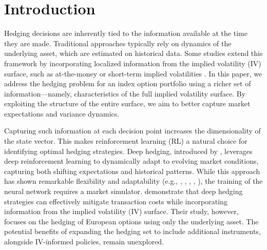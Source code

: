 \documentclass[12pt]{article}
\def\doublespacing{\setstretch{2}}
\begin{document}
\doublespacing%

\section{Introduction}\label{se:intro}

Hedging decisions are inherently tied to the information available at the time they are made. Traditional approaches typically rely on dynamics of the underlying asset, which are estimated on historical data. Some studies extend this framework by incorporating localized information from the implied volatility (IV) surface, such as at-the-money or short-term implied volatilities \citep{BATES2005195, ALEXANDER2007, franccois2021smile}. In this paper, we address the hedging problem for an index option portfolio using a richer set of information—namely, characteristics of the full implied volatility surface. By exploiting the structure of the entire surface, we aim to better capture market expectations and variance dynamics. 

Capturing such information at each decision point increases the dimensionality of the state vector. This makes reinforcement learning (RL) a natural choice for identifying optimal hedging strategies.
Deep hedging, introduced by \cite{buehler2019deep}, leverages deep reinforcement learning to dynamically adapt to evolving market conditions, capturing both shifting expectations and historical patterns. While this approach has shown remarkable flexibility and adaptability (e.g., \cite{du2020deep}, \cite{cao2020deep}, \cite{carbonneau2021deep}, \cite{wu2023robust}, \cite{cao2023gamma}), the training of the neural network requires a market simulator. \cite{François2025} demonstrate that deep hedging strategies can effectively mitigate transaction costs while incorporating information from the implied volatility (IV) surface. Their study, however, focuses on the hedging of European options using only the underlying asset. The potential benefits of expanding the hedging set to include additional instruments, alongside IV-informed policies, remain unexplored.
\end{document}
